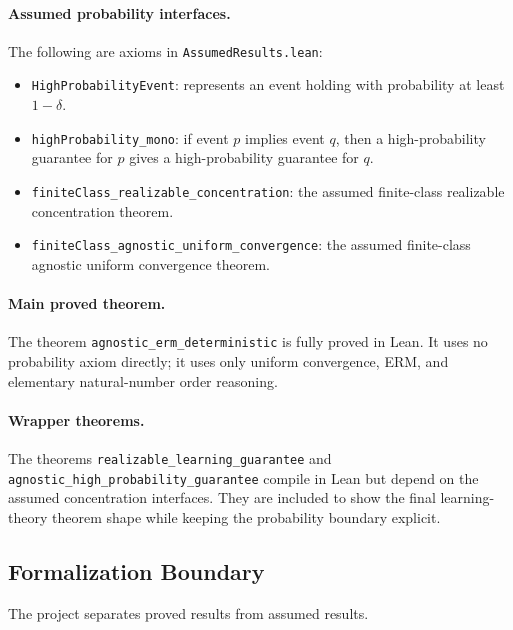 \documentclass[11pt]{article}
\theoremstyle{definition}
\begin{document}
\paragraph{Assumed probability interfaces.}
The following are axioms in \texttt{AssumedResults.lean}:
\begin{itemize}[leftmargin=*]
  \item \texttt{HighProbabilityEvent}: represents an event holding with
  probability at least $1-\delta$.
  \item \texttt{highProbability\_mono}: if event $p$ implies event $q$, then a
  high-probability guarantee for $p$ gives a high-probability guarantee for $q$.
  \item \texttt{finiteClass\_realizable\_concentration}: the assumed finite-class
  realizable concentration theorem.
  \item \texttt{finiteClass\_agnostic\_uniform\_convergence}: the assumed
  finite-class agnostic uniform convergence theorem.
\end{itemize}

\paragraph{Main proved theorem.}
The theorem \texttt{agnostic\_erm\_deterministic} is fully proved in Lean. It
uses no probability axiom directly; it uses only uniform convergence, ERM, and
elementary natural-number order reasoning.

\paragraph{Wrapper theorems.}
The theorems \texttt{realizable\_learning\_guarantee} and
\texttt{agnostic\_high\_probability\_guarantee} compile in Lean but depend on
the assumed concentration interfaces. They are included to show the final
learning-theory theorem shape while keeping the probability boundary explicit.

\subsection{Formalization Boundary}

The project separates proved results from assumed results.
\end{document}
